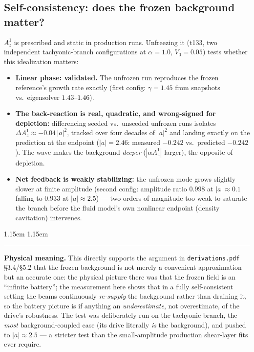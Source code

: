 \documentclass[11pt,a4paper]{article}
\numberwithin{equation}{section}
\theoremstyle{remark}
\newenvironment{physmeaning}%
{\par\medskip\noindent
 \begin{list}{}{\leftmargin 1.15em \rightmargin 1.15em \listparindent 0pt
 \itemindent 0pt \parsep 2pt \topsep 2pt}\item\relax
 \small\textcolor{meancol}{\rule[-0.6ex]{2.6pt}{2.4ex}}\hspace{0.55em}%
 \textcolor{meancol}{\textbf{Physical meaning.}}\hspace{0.5em}\ignorespaces}%
{\end{list}\medskip}
\newcommand{\Vo}{V_0}
\begin{document}
\subsection{Self-consistency: does the frozen background matter?}
\label{ssec:backreactionresult}

$A_z^1$ is prescribed and static in production runs. Unfreezing it (t133,
two independent tachyonic-branch configurations at $\alpha=1.0$,
$\Vo=0.05$) tests whether this idealization matters:

\begin{itemize}
\item \textbf{Linear phase: validated.} The unfrozen run reproduces the
frozen reference's growth rate exactly (first config: $\gamma=1.45$ from
snapshots vs.\ eigensolver $1.43$--$1.46$).
\item \textbf{The back-reaction is real, quadratic, and wrong-signed for
depletion:} differencing seeded vs.\ unseeded unfrozen runs isolates
$\Delta A_z^1\approx-0.04\,|a|^2$, tracked over four decades of $|a|^2$
and landing exactly on the prediction at the endpoint
($|a|=2.46$: measured $-0.242$ vs.\ predicted $-0.242$). The wave makes the
background \emph{deeper} ($|\alpha A_z^1|$ larger), the opposite of
depletion.
\item \textbf{Net feedback is weakly stabilizing:} the unfrozen mode
grows slightly slower at finite amplitude (second config: amplitude ratio
$0.998$ at $|a|\approx0.1$ falling to $0.933$ at $|a|\approx2.5$) ---
two orders of magnitude too weak to saturate the branch before the fluid
model's own nonlinear endpoint (density cavitation) intervenes.
\end{itemize}

\begin{physmeaning}
This directly supports the argument in \texttt{derivations.pdf}
\S3.4/\S5.2 that the frozen background is not merely a convenient
approximation but an accurate one: the physical picture there was that the
frozen field is an ``infinite battery''; the measurement here shows that
in a fully self-consistent setting the beams continuously \emph{re-supply}
the background rather than draining it, so the battery picture is if
anything an \emph{underestimate}, not overestimate, of the drive's
robustness. The test was deliberately run on the tachyonic branch, the
\emph{most} background-coupled case (its drive literally \emph{is} the
background), and pushed to $|a|\approx2.5$ --- a stricter test than the
small-amplitude production shear-layer fits ever require.
\end{physmeaning}
\end{document}
